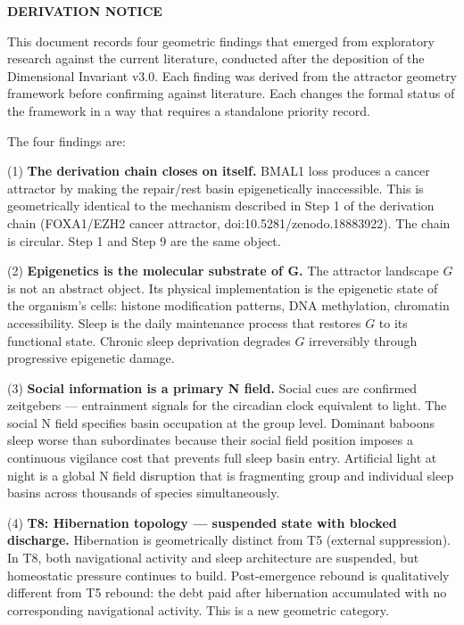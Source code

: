 \documentclass[10pt, a4paper]{article}
\begin{document}
\begin{mdframed}[backgroundcolor=derivbox,
  linecolor=headergreen,linewidth=0.8pt,
  innertopmargin=0.6em,innerbottommargin=0.6em,
  innerleftmargin=0.8em,innerrightmargin=0.8em]
\textbf{DERIVATION NOTICE}

\smallskip
This document records four geometric
findings that emerged from exploratory
research against the current literature,
conducted after the deposition of the
Dimensional Invariant v3.0. Each finding
was derived from the attractor geometry
framework before confirming against
literature. Each changes the formal
status of the framework in a way that
requires a standalone priority record.

\smallskip
The four findings are:

\smallskip
(1) \textbf{The derivation chain closes
on itself.} BMAL1 loss produces a cancer
attractor by making the repair/rest basin
epigenetically inaccessible. This is
geometrically identical to the mechanism
described in Step 1 of the derivation
chain (FOXA1/EZH2 cancer attractor,
doi:10.5281/zenodo.18883922). The chain
is circular. Step 1 and Step 9 are the
same object.

\smallskip
(2) \textbf{Epigenetics is the molecular
substrate of G.} The attractor landscape
$G$ is not an abstract object. Its
physical implementation is the epigenetic
state of the organism's cells: histone
modification patterns, DNA methylation,
chromatin accessibility. Sleep is the
daily maintenance process that restores
$G$ to its functional state. Chronic
sleep deprivation degrades $G$
irreversibly through progressive
epigenetic damage.

\smallskip
(3) \textbf{Social information is a
primary N field.} Social cues are
confirmed zeitgebers --- entrainment
signals for the circadian clock
equivalent to light. The social N field
specifies basin occupation at the group
level. Dominant baboons sleep worse than
subordinates because their social field
position imposes a continuous vigilance
cost that prevents full sleep basin entry.
Artificial light at night is a global
N field disruption that is fragmenting
group and individual sleep basins across
thousands of species simultaneously.

\smallskip
(4) \textbf{T8: Hibernation topology ---
suspended state with blocked discharge.}
Hibernation is geometrically distinct
from T5 (external suppression). In T8,
both navigational activity and sleep
architecture are suspended, but
homeostatic pressure continues to build.
Post-emergence rebound is qualitatively
different from T5 rebound: the debt
paid after hibernation accumulated with
no corresponding navigational activity.
This is a new geometric category.
\end{mdframed}
\end{document}

